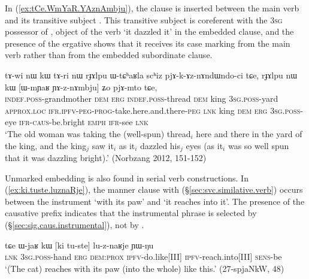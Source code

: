 In (\ref{ex:tCe.WmYaR.YAznAmbju}), the clause  is inserted between the main verb  and its transitive subject . This transitive subject is coreferent with the \textsc{3sg} possessor of , object of the verb  `it dazzled it' in the embedded clause, and the presence of the ergative  shows that it receives its case marking from the main verb rather than from the embedded subordinate clause.  
 
\begin{exe}
\ex \label{ex:tCe.WmYaR.YAznAmbju}
\gll tɤ-wi nɯ kɯ tɤ-ri nɯ rɟɤlpu ɯ-tɕʰaʁla scʰiz pjɤ-k-ɤz-nɤndɯndo-ci tɕe, rɟɤlpu nɯ kɯ [ɯ-mɲaʁ ɲɤ-z-nɤmbju] ʑo pjɤ-mto tɕe,  \\
\textsc{indef}.\textsc{poss}-grandmother \textsc{dem} \textsc{erg} \textsc{indef}.\textsc{poss}-thread \textsc{dem} king \textsc{3sg}.\textsc{poss}-yard \textsc{approx}.\textsc{loc} \textsc{ifr}.\textsc{ipfv}-\textsc{peg}-\textsc{prog}-take.here.and.there-\textsc{peg} \textsc{lnk} king  \textsc{dem} \textsc{erg} \textsc{3sg}.\textsc{poss}-eye \textsc{ifr}-\textsc{caus}-be.bright \textsc{emph} \textsc{ifr}-see \textsc{lnk} \\
\glt `The old woman was taking the (well-spun) thread$_i$ here and there in the yard of the king, and the king$_j$ saw it$_i$ as it$_i$ dazzled his$_j$ eyes (as it$_i$ was so well spun that it was dazzling bright).'  (Norbzang 2012, 151-152)
\end{exe} 


Unmarked embedding is also found in serial verb constructions. In (\ref{ex:ki.tuste.luznaRje}), the manner clause with  (§\ref{sec:svc.similative.verb}) occurs between the instrument  `with its paw' and  `it reaches into it'. The presence of the causative prefix  indicates that the instrumental phrase is selected by  (§\ref{sec:sig.caus.instrumental}), not by .

\begin{exe}
\ex \label{ex:ki.tuste.luznaRje}
 \gll tɕe ɯ-jaʁ kɯ [ki tu-ste] lu-z-naʁje ɲɯ-ŋu  \\
 \textsc{lnk} \textsc{3sg}.\textsc{poss}-hand \textsc{erg} \textsc{dem}:\textsc{prox} \textsc{ipfv}-do.like[III]  \textsc{ipfv}-reach.into[III] \textsc{sens}-be   \\
\glt `(The cat) reaches with its paw (into the whole) like this.' (27-spjaNkW, 48)
\end{exe}

